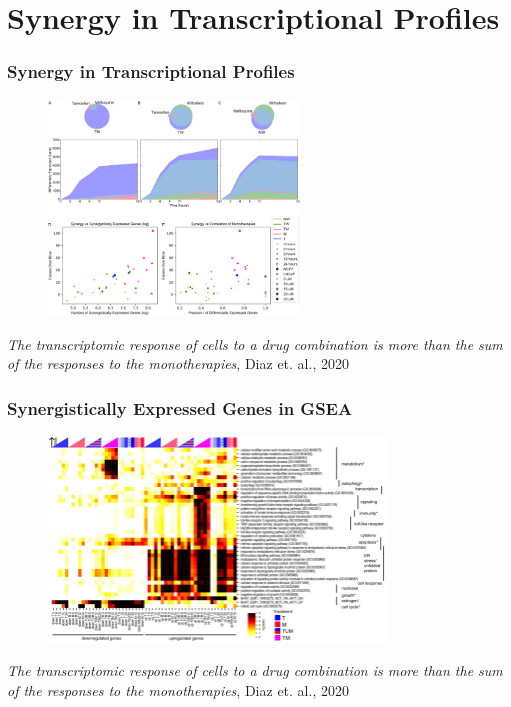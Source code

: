 \documentclass{beamer}
\begin{document}
\section{Synergy in Transcriptional Profiles}

\begin{frame}
  \frametitle{Synergy in Transcriptional Profiles}
  \begin{figure}[!htb] 
    \includegraphics[width=0.6\textwidth]{figs/transcriptomic-synergy.jpg}
  \end{figure}
  \small{\textit{The transcriptomic response of cells to a drug combination is more than the sum of the responses to the monotherapies}, Diaz et. al., 2020}~\cite{Diaz2020-bi}
\end{frame}

\begin{frame}
  \frametitle{Synergistically Expressed Genes in GSEA}
  \begin{figure}[!htb]
    \includegraphics[width=0.8\textwidth]{figs/transcriptomic-synergy-gsea.jpg}
  \end{figure}
  \small{\textit{The transcriptomic response of cells to a drug combination is more than the sum of the responses to the monotherapies}, Diaz et. al., 2020}~\cite{Diaz2020-bi}
\end{frame}
\end{document}
